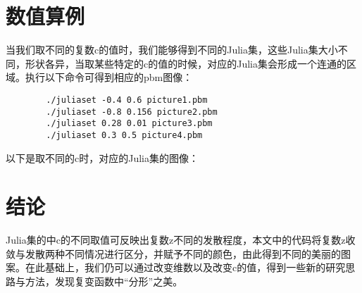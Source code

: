 \documentclass[UTF8,a4paper]{ctexart}
\begin{document}
	\section{数值算例}
	当我们取不同的复数c的值时，我们能够得到不同的Julia集，这些Julia集大小不同，形状各异，当取某些特定的c的值的时候，对应的Julia集会形成一个连通的区域。执行以下命令可得到相应的pbm图像：
	\begin{verbatim}
		./juliaset -0.4 0.6 picture1.pbm
		./juliaset -0.8 0.156 picture2.pbm
		./juliaset 0.28 0.01 picture3.pbm
		./juliaset 0.3 0.5 picture4.pbm
	\end{verbatim}
	以下是取不同的c时，对应的Julia集的图像：
	\begin{figure}[ht]
		\centering
	\end{figure}
	\begin{figure}[ht]
		\centering
	\end{figure}
	\newpage
	\section{结论}
	Julia集的中c的不同取值可反映出复数z不同的发散程度，本文中的代码将复数z收敛与发散两种不同情况进行区分，并赋予不同的颜色，由此得到不同的美丽的图案。在此基础上，我们仍可以通过改变维数以及改变c的值，得到一些新的研究思路与方法，发现复变函数中“分形”之美。
	
	
	
\end{document}
